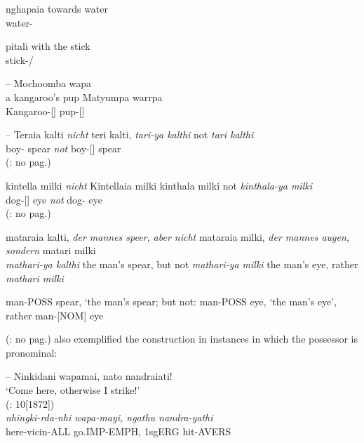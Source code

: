 \documentclass{langscibook}
\begin{document}
\begin{xlist}
\begin{xlist}
\begin{xlist}
\ea\label{bkm:Ref329627599}
nghapaia towards water
\\
water-\\
\glt \citep[52]{flierl_dieri_1880}
\z



\ea
\label{bkm:Ref329627843}
pitali with the stick
\\
stick-/\\
\glt \citep[52]{flierl_dieri_1880}
\z

--
\ea\label{bkm:Ref329628202}
Mochoomba wapa\\
a kangaroo’s pup
\gll Matyumpa warrpa\\
Kangaroo-[]    pup-[]\\
\glt  \citep[8]{Roth1897}
\z




--
\ea\label{bkm:Ref329628748}
Teraia         kalti{} {\textit{nicht}}   teri kalti,
\gll    \textit{tari-ya        kalthi} not  \textit{tari   kalthi}\\
boy-  spear       \textit{not}    boy-[] spear\\
\glt (\citealt{koch_untitled_1868}: no pag.)
\z

\ea   \label{bkm:Ref329628762}
kintella     milki   {\textit{nicht}}{} Kintellaia milki
\gll    kinthala      milki not  \textit{kinthala-ya   milki}\\
dog-[]   eye   \textit{not} dog-   eye\\
\glt (\citealt{koch_untitled_1868}: no pag.)
\z



\ea          mataraia kalti, {\textit{der mannes speer,}} {\textit{aber nicht}} mataraia milki, {\textit{der mannes augen, sondern}}{} matari milki\\
 \textit{mathari-ya kalthi} the man’s spear, but not      \textit{mathari-ya milki} the man’s eye,      rather       \textit{mathari  milki}

\citep[12]{flierl_christianieli_1880}

                         man-POSS spear, ‘the man’s spear; but not:    man-POSS eye, ‘the man’s eye’, rather     man-[NOM] eye
\z

(\citealt{koch_untitled_1868}: no pag.) also exemplified the construction in instances in which the possessor is pronominal:


--
\ea\label{bkm:Ref339715937}
Ninkidani     wapamai,      nato     nandraiati!\\
\glt `Come here, otherwise I strike!' \\
(\citealt{schoknecht_grammar_1947}: 10[1872]) \\
\textit{nhingki-rda-nhi    wapa-mayi,      ngathu    nandra-yathi} \\
here-vicin-ALL     go.IMP-EMPH,   1sgERG   hit-AVERS
\z




\end{xlist}
\end{xlist}
\end{xlist}
\end{document}
